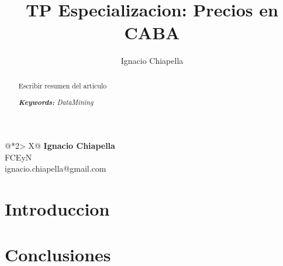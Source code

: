 \documentclass{icisfinal}
\title{TP Especializacion: Precios en CABA}
\begin{document}
\author{Ignacio Chiapella}
\maketitle

\begin{table}[h!]
  \centering
  \LARGE
  \begin{tabularx}{\textwidth}{@{}*2{>
  {\centering\arraybackslash}X}@{}}       
    \textbf{Ignacio Chiapella} \\
    FCEyN   \\
    ignacio.chiapella@gmail.com 
  \end{tabularx}
\end{table}

\begin{abstract}
  Escribir resumen del articulo

  \emph{\textbf{Keywords:} DataMining}
\end{abstract}

\newpage
\section{Introduccion}


\newpage
\section{Conclusiones}


\printbibliography
\end{document}
